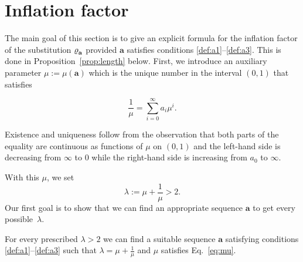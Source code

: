 \section{Inflation factor} \label{sec:infl}

%

The main goal of this section is to give an explicit formula for the inflation factor of the substitution $\varrho^{  }_{\bf{a}}$ provided $\mathbf a$ satisfies conditions \ref{def:a1}--\ref{def:a3}. This is done in Proposition~\ref{prop:length} below. First, we introduce an auxiliary parameter $\mu:=\mu(\mathbf a)$ which is the unique number in the interval $(0,1)$ that satisfies

\begin{equation}\label{eq:mu}
\frac{1}{\mu}=\sum_{i=0}^\infty a_i \mu^i.
\end{equation}

Existence and uniqueness follow from the observation that both parts of the equality are continuous as functions of $\mu$ on $(0,1)$ and the left-hand side is decreasing from $\infty$ to $0$ while the right-hand side is increasing from $a_0$ to $\infty$.
 
With this $\mu$, we set $$\lambda:=\mu+\frac{1}{\mu}>2.$$
Our first goal is to show that we can find an appropriate sequence $\mathbf a$ to get every possible~$\lambda$.




\begin{lem}\label{lem:inflation}
For every prescribed $\lambda>2$ we can find a suitable sequence $\mathbf a$ satisfying conditions \textnormal{\ref{def:a1}--\ref{def:a3}} such that $\lambda=\mu+\frac{1}{\mu}$ and $\mu$ satisfies Eq.~\eqref{eq:mu}.
\end{lem}

